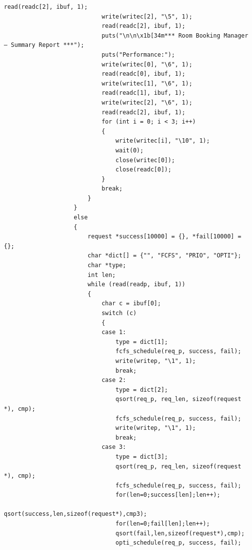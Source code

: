 \documentclass{article}
\begin{document}
\begin{Verbatim}[gobble=8]
                            read(readc[2], ibuf, 1);
                            write(writec[2], "\5", 1);
                            read(readc[2], ibuf, 1);
                            puts("\n\n\x1b[34m*** Room Booking Manager – Summary Report ***");
                            puts("Performance:");
                            write(writec[0], "\6", 1);
                            read(readc[0], ibuf, 1);
                            write(writec[1], "\6", 1);
                            read(readc[1], ibuf, 1);
                            write(writec[2], "\6", 1);
                            read(readc[2], ibuf, 1);
                            for (int i = 0; i < 3; i++)
                            {
                                write(writec[i], "\10", 1);
                                wait(0);
                                close(writec[0]);
                                close(readc[0]);
                            }
                            break;
                        }
                    }
                    else
                    {
                        request *success[10000] = {}, *fail[10000] = {};
                        char *dict[] = {"", "FCFS", "PRIO", "OPTI"};
                        char *type;
                        int len;
                        while (read(readp, ibuf, 1))
                        {
                            char c = ibuf[0];
                            switch (c)
                            {
                            case 1:
                                type = dict[1];
                                fcfs_schedule(req_p, success, fail);
                                write(writep, "\1", 1);
                                break;
                            case 2:
                                type = dict[2];
                                qsort(req_p, req_len, sizeof(request *), cmp);
                                fcfs_schedule(req_p, success, fail);
                                write(writep, "\1", 1);
                                break;
                            case 3:
                                type = dict[3];
                                qsort(req_p, req_len, sizeof(request *), cmp);
                                fcfs_schedule(req_p, success, fail);
                                for(len=0;success[len];len++);
                                qsort(success,len,sizeof(request*),cmp3);
                                for(len=0;fail[len];len++);
                                qsort(fail,len,sizeof(request*),cmp);
                                opti_schedule(req_p, success, fail);

\end{Verbatim}
\end{document}
